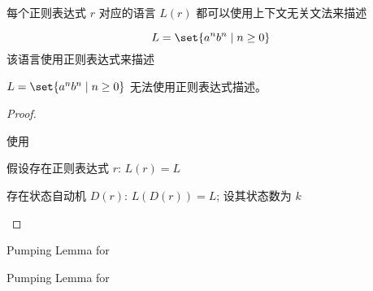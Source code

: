\begin{frame}{}
  \begin{center}
    每个正则表达式 $r$ 对应的语言 $L(r)$ 都可以使用上下文无关文法来描述
  \end{center}
\end{frame}

\begin{frame}{}
  \begin{center}
    

    \[
      L = \set{a^{n} b^{n} \mid n \ge 0}
    \]
    该语言使用正则表达式来描述
  \end{center}
\end{frame}

\begin{frame}{}
  \begin{theorem}
    $L = \set{a^{n} b^{n} \mid n \ge 0}$ 无法使用正则表达式描述。
  \end{theorem}

  \pause
  \vspace{0.50cm}
  \begin{proof}
    \begin{center}
      使用

      \vspace{0.30cm}
      假设存在正则表达式 $r$: $L(r) = L$

      \vspace{0.30cm}
      存在状态自动机 $D(r)$: $L(D(r)) = L$; 设其状态数为 $k$
    \end{center}
  \end{proof}

  \begin{center}
    Pumping Lemma for 
  \end{center}
\end{frame}

\begin{frame}{}
  \begin{center}
    Pumping Lemma for 
  \end{center}
\end{frame}
